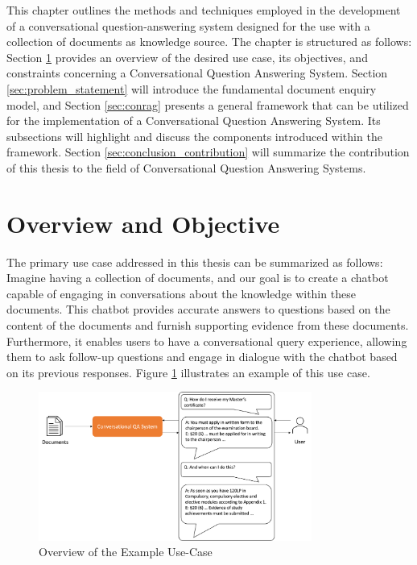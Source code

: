 This chapter outlines the methods and techniques employed in the development of a conversational question-answering system designed for the use with a collection of documents as knowledge source. The chapter is structured as follows: Section \ref{sec:overview} provides an overview of the desired use case, its objectives, and constraints concerning a Conversational Question Answering System. Section \ref{sec:problem_statement} will introduce the fundamental document enquiry model, and Section \ref{sec:conrag} presents a general framework that can be utilized for the implementation of a Conversational Question Answering System. Its subsections will highlight and discuss the components introduced within the framework. Section \ref{sec:conclusion_contribution} will summarize the contribution of this thesis to the field of Conversational Question Answering Systems.


\section{Overview and Objective}
\label{sec:overview}

The primary use case addressed in this thesis can be summarized as follows: Imagine having a collection of documents, and our goal is to create a chatbot capable of engaging in conversations about the knowledge within these documents. This chatbot provides accurate answers to questions based on the content of the documents and furnish supporting evidence from these documents. Furthermore, it enables users to have a conversational query experience, allowing them to ask follow-up questions and engage in dialogue with the chatbot based on its previous responses. Figure \ref{fig:use-case} illustrates an example of this use case.

\begin{figure}
    \centering
    \includegraphics[width=0.8\textwidth]{Grafiken/Use_Case.png}
    \caption{Overview of the Example Use-Case}
    \label{fig:use-case}
\end{figure}


